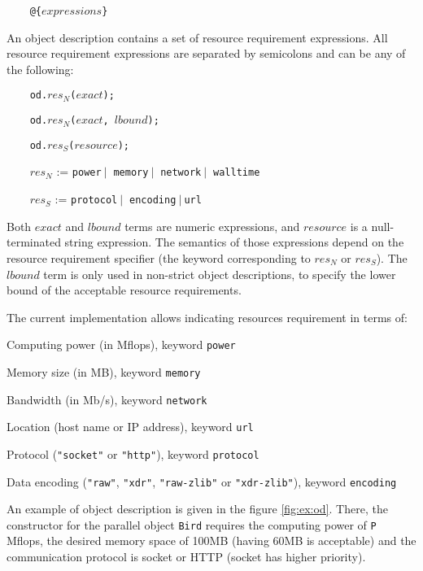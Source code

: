 \texttt{~~~~@\{}$expressions$\texttt{\}}

An object description contains a set of resource requirement
expressions. All resource requirement expressions are separated by
semicolons and can be any of the following:

\texttt{~~~~od.}$res_N$\texttt{(}$exact$\texttt{);}

\texttt{~~~~od.}$res_N$\texttt{(}$exact$\texttt{, }$lbound$\texttt{);}

\texttt{~~~~od.}$res_S$\texttt{(}$resource$\texttt{);}

\texttt{~~~~}$res_N$ := \texttt{power}$~|~$
	\texttt{memory}$~|~$
	\texttt{network}$~|~$
	\texttt{walltime}

\texttt{~~~~}$res_S$ := \texttt{protocol}$~|~$
	\texttt{encoding}$~|~$\texttt{url}

Both $exact$ and $lbound$ terms are numeric expressions, and
$resource$ is a null-terminated string expression. The semantics of those
expressions depend on the resource requirement specifier (the keyword
corresponding to $res_N$ or $res_S$).
The $lbound$ term is only used in non-strict object descriptions, to
specify the lower bound of the acceptable resource requirements.

The current implementation allows indicating resources requirement in
terms of:

\begin{petitem}

\item Computing power (in Mflops), keyword \texttt{power}

\item Memory size (in MB), keyword \texttt{memory}

\item Bandwidth (in Mb/s), keyword \texttt{network}

\item Location (host name or IP address), keyword \texttt{url}

\item Protocol (\texttt{"socket"} or \texttt{"http"}), keyword \texttt{protocol}

\item Data encoding (\texttt{"raw"}, \texttt{"xdr"}, \texttt{"raw-zlib"}
	or \texttt{"xdr-zlib"}), keyword \texttt{encoding}

\end{petitem}

An example of object description is given in the figure \ref{fig:ex:od}.
There, the constructor for the parallel object \texttt{Bird} requires
the computing power of \texttt{P} Mflops, the desired memory space of
100MB (having 60MB is acceptable) and the communication protocol is
socket or HTTP (socket has higher priority).



